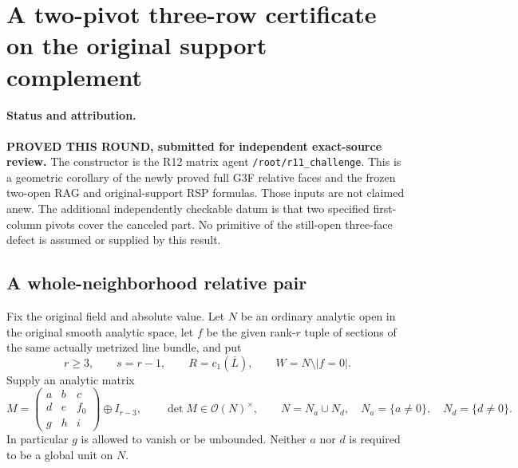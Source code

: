 \section{A two-pivot three-row certificate on the original support complement}
\label{sec:r12-two-pivot-three-row-green}

\paragraph{Status and attribution.}
\textbf{PROVED THIS ROUND, submitted for independent exact-source review.}
The constructor is the R12 matrix agent \texttt{/root/r11\_challenge}.
This is a geometric corollary of the newly proved full G3F relative
faces and the frozen two-open RAG and original-support RSP formulas.
Those inputs are not claimed anew.  The additional independently
checkable datum is that two specified first-column pivots cover the
canceled part.  No primitive of the still-open three-face defect is
assumed or supplied by this result.

\subsection{A whole-neighborhood relative pair}

Fix the original field and absolute value.  Let $N$ be an ordinary
analytic open in the original smooth analytic space, let $f$ be the
given rank-$r$ tuple of sections of the same actually metrized line
bundle, and put
\[
 r\ge3,\qquad s=r-1,\qquad R=c_1(\overline L),\qquad
 W=N\setminus|f=0|.
 \tag{TPG1}
\]
Supply an analytic matrix
\[
 M=\begin{pmatrix}a&b&c\\d&e&f_0\\g&h&i\end{pmatrix}
                       \oplus I_{r-3},\qquad \det M\in\mathcal O(N)^\times,
 \qquad N=N_a\cup N_d,
 \quad N_a=\{a\ne0\},\quad N_d=\{d\ne0\}.
 \tag{TPG2}
\]
In particular $g$ is allowed to vanish or be unbounded.  Neither
$a$ nor $d$ is required to be a global unit on $N$.

